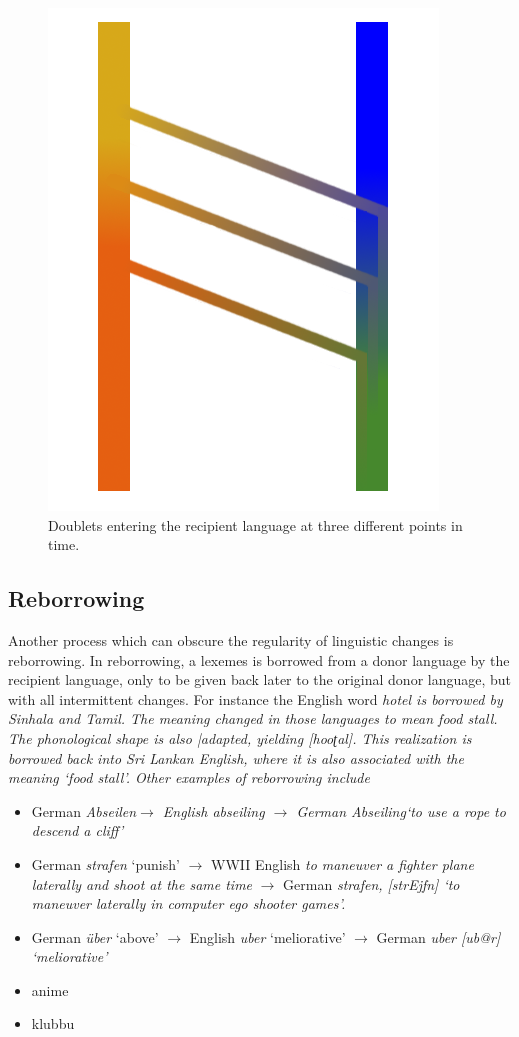 \documentclass[a4paper,10pt]{article}
\newcommand{\phonet}[1]{[#1]}
\newcommand{\trs}[2]{\textit{#1} `#2'}
\newcommand{\tz}{ʈ}
\begin{document}
\begin{figure}
    \includegraphics[height=.3\textheight]{triplet.png}
\caption{Doublets entering the recipient language at three different points in time.}
\label{fig:doublets}
\end{figure}


\subsection{Reborrowing}
Another process which can obscure the regularity of linguistic changes is reborrowing. In reborrowing, a lexemes is borrowed from a donor language by the recipient language, only to be given back later to the original donor language, but with all intermittent changes. For instance the English word \em hotel \em is borrowed by Sinhala and Tamil. The meaning changed in those languages to mean \em food stall\em. The phonological shape is also |adapted, yielding \phonet{hoo{\tz}al}. This realization is borrowed back into Sri Lankan English, where it is also associated with the meaning `food stall'. Other examples of reborrowing include 

\begin{itemize}
 \item German \em Abseilen\em $\to$ English \em abseiling \em $\to$ German \em Abseiling\em `to use a rope to descend a cliff'
 \item German \trs{strafen}{punish} $\to$ WWII English {\em to maneuver a fighter plane laterally and shoot at the same time} $\to$ German \em strafen\em, \phonet{strEjfn} `to maneuver laterally in computer ego shooter games'.
 \item German \trs{\"uber}{above} $\to$ English \trs{uber}{meliorative} $\to$ German \em uber \em \phonet{ub@\;r} `meliorative'
 \item anime
 \item klubbu
\end{itemize}
\end{document}

